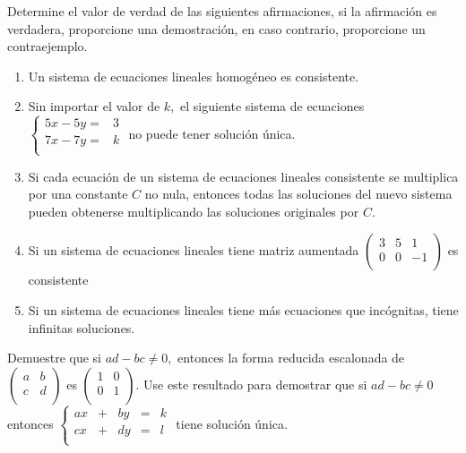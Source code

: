 \begin{prob} Determine el valor de verdad de las siguientes afirmaciones, si la afirmación es verdadera, proporcione una demostración, en caso contrario, proporcione un contraejemplo.

\begin{enumerate}[$a)$]
\item Un sistema de ecuaciones lineales homogéneo es consistente.
\item Sin importar el valor de $k,$ el siguiente sistema de ecuaciones $ \left\lbrace \begin{array}{ccccc}
5x-5y=&3\\
7x-7y=&k\\
\end{array} \right.  $ no puede tener solución única.


\item Si cada ecuación de un sistema de ecuaciones lineales consistente se multiplica por una constante $C$ no nula, entonces todas las soluciones del nuevo sistema pueden obtenerse multiplicando las soluciones originales por $C.$

\item Si un sistema de ecuaciones lineales tiene matriz aumentada $\left( \begin{array}{cc|c} 3&5 &1\\0&0 &-1\\ \end{array} \right)$
es consistente

\item Si un sistema de ecuaciones lineales tiene más ecuaciones que incógnitas, tiene infinitas soluciones.


\end{enumerate}

\end{prob}

\begin{prob} Demuestre que si $ad-bc\neq 0,$ entonces la forma reducida escalonada de $\left( \begin{array}{cc} a& b\\
c&d\\ \end{array}  \right)$ es $\left( \begin{array}{cc} 1& 0\\
0&1\\ \end{array}  \right)$. Use este resultado para demostrar que si $ad-bc\neq 0$
 entonces $ \left\lbrace \begin{array}{ccccc}
ax&+&by&=&k\\
cx&+&dy&=&l\\
\end{array} \right.  $ tiene solución única.
\end{prob}

